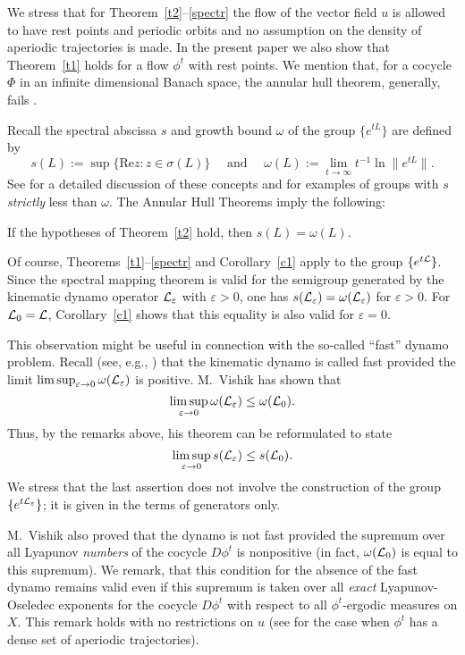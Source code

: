 We stress that for Theorem~\ref{t2}--\ref{spectr} 
the flow of the vector field $u$ is allowed to have rest points
and periodic orbits and no assumption on the density of
aperiodic trajectories is made. In the present paper we also
show that Theorem~\ref{t1}
holds for a flow $\phi^t$ with rest points. 
We mention that, for a cocycle $\Phi$ in an infinite
dimensional Banach space, the annular hull theorem, generally, fails
\cite{LS,Mont}.

Recall the 
spectral abscissa $s$ and growth bound $\omega$ of the group $\{e^{tL}\}$
are defined by
\[
s(L):=\sup\{
\mbox{Re} z: z\in\sigma(L)\} \quad \mbox{ and }\quad
\omega(L):=\lim_{t\to\infty}t^{-1}\ln\|e^{tL}\|.
\] 
See \cite{Nagel} 
for a detailed discussion of these concepts and for
examples of groups with
$s$ {\em strictly} less than $\omega$. 
The Annular Hull Theorems imply the following:
\begin{cor}
If the hypotheses of Theorem~\ref{t2} hold, then
$s(L)=\omega(L)$. 
\end{cor}

Of course, Theorems~\ref{t1}--\ref{spectr} and Corollary~\ref{c1} 
apply to the group $\{e^{t{\cal{L}}}\}$. Since
the spectral mapping theorem is
valid for the semigroup generated by the kinematic dynamo operator
${\cal{L}}_\varepsilon$ with $\varepsilon>0$, 
one has
$s({\cal{L}}_\varepsilon)=\omega({\cal{L}}_\varepsilon)$ for $\varepsilon>0$. For
${\cal{L}}_0={\cal{L}}$,  Corollary~\ref{c1} shows that this equality is also
valid for $\varepsilon=0$.

This observation might be useful in connection with the so-called
``fast'' dynamo problem.
Recall (see, e.g., \cite{Arnold,AZRS,BC}) that the
kinematic dynamo is called
fast provided the limit
$\limsup_{\varepsilon\to 0}\omega({\cal{L}}_\varepsilon)$
is positive.
M.~Vishik \cite{Vishik} has shown that
\[\limsup_{\varepsilon\to 0}\omega({\cal{L}}_\varepsilon)\leq \omega({\cal{L}}_0).\] 
Thus, by the remarks above,
his theorem can be reformulated to state 
\[\limsup_{\varepsilon\to 0}s({\cal{L}}_\varepsilon)\leq s({\cal{L}}_0).\]
We stress that
the last assertion does not involve the construction of the group
$\{e^{t{\cal{L}}_\varepsilon}\}$; it is given in the terms of generators only.

M.~Vishik \cite{Vishik} also proved that the dynamo is not fast 
provided the supremum over all Lyapunov {\it numbers}
of the cocycle $D\phi^t$ is nonpositive (in fact, $\omega({\cal{L}}_0)$
is equal to this supremum). 
We remark, that this condition for the absence of the fast dynamo
remains valid even if this supremum is taken 
over all {\it exact} Lyapunov-Oseledec
exponents for the cocycle $D\phi^t$
with respect to all 
$\phi^t$-ergodic measures on $X$. This remark holds
with no restrictions on $u$
(see \cite[Remark~3.8]{clms}
for the case when $\phi^t$ has  a dense set of aperiodic trajectories). 
